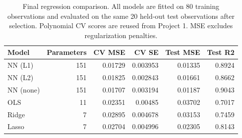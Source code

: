 \begin{table}[t]
    \centering
    \caption{Final regression comparison. All models are fitted on 80 training observations and evaluated on the same 20 held-out test observations after selection. Polynomial CV scores are reused from Project 1. MSE excludes regularization penalties.}
    \label{tab:part_d_final_comparison}
    \begin{tabular}{lrrrrr}
        \hline\hline
        Model     & Parameters & CV MSE  & CV SE    & Test MSE & Test R2 \\
        \hline
        NN (L1)   & 151        & 0.01729 & 0.003953 & 0.01335  & 0.8924  \\
        NN (L2)   & 151        & 0.01825 & 0.002843 & 0.01661  & 0.8662  \\
        NN (none) & 151        & 0.01707 & 0.003194 & 0.01187  & 0.9043  \\
        OLS       & 11         & 0.02351 & 0.00485  & 0.03702  & 0.7017  \\
        Ridge     & 7          & 0.02895 & 0.004678 & 0.03153  & 0.7459  \\
        Lasso     & 7          & 0.02704 & 0.004996 & 0.02305  & 0.8143  \\
        \hline\hline
    \end{tabular}
\end{table}

